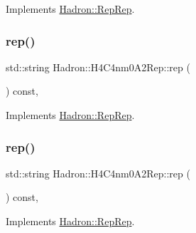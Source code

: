 Implements \mbox{\hyperlink{structHadron_1_1RepRep_ab3213025f6de249f7095892109575fde}{Hadron\+::\+Rep\+Rep}}.

\mbox{\label{structHadron_1_1H4C4nm0A2Rep_a8da7c1c6f969806290e6452367fce7ea}} 
\subsubsection{\texorpdfstring{rep()}{rep()}\hspace{0.1cm}{\footnotesize\ttfamily [2/5]}}
{\footnotesize\ttfamily std\+::string Hadron\+::\+H4\+C4nm0\+A2\+Rep\+::rep (\begin{DoxyParamCaption}{ }\end{DoxyParamCaption}) const\hspace{0.3cm}{\ttfamily [inline]}, {\ttfamily [virtual]}}



Implements \mbox{\hyperlink{structHadron_1_1RepRep_ab3213025f6de249f7095892109575fde}{Hadron\+::\+Rep\+Rep}}.

\mbox{\label{structHadron_1_1H4C4nm0A2Rep_a8da7c1c6f969806290e6452367fce7ea}} 
\subsubsection{\texorpdfstring{rep()}{rep()}\hspace{0.1cm}{\footnotesize\ttfamily [3/5]}}
{\footnotesize\ttfamily std\+::string Hadron\+::\+H4\+C4nm0\+A2\+Rep\+::rep (\begin{DoxyParamCaption}{ }\end{DoxyParamCaption}) const\hspace{0.3cm}{\ttfamily [inline]}, {\ttfamily [virtual]}}



Implements \mbox{\hyperlink{structHadron_1_1RepRep_ab3213025f6de249f7095892109575fde}{Hadron\+::\+Rep\+Rep}}.

\mbox{\label{structHadron_1_1H4C4nm0A2Rep_a8da7c1c6f969806290e6452367fce7ea}} 
